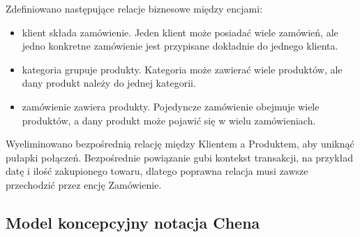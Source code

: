 \documentclass[a4paper,11pt,english,openany,oneside]{sphinxmanual}
\begin{document}
\sphinxAtStartPar
Zdefiniowano następujące relacje biznesowe między encjami:
\begin{itemize}
\item {} 
\sphinxAtStartPar
{} klient składa zamówienie. Jeden klient może posiadać wiele zamówień, ale jedno konkretne zamówienie jest przypisane dokładnie do jednego klienta.

\item {} 
\sphinxAtStartPar
{} kategoria grupuje produkty. Kategoria może zawierać wiele produktów, ale dany produkt należy do jednej kategorii.

\item {} 
\sphinxAtStartPar
{} zamówienie zawiera produkty. Pojedyncze zamówienie obejmuje wiele produktów, a dany produkt może pojawić się w wielu zamówieniach.

\end{itemize}

\sphinxAtStartPar
{}

\sphinxAtStartPar
Wyeliminowano bezpośrednią relację między Klientem a Produktem, aby uniknąć pułapki połączeń. Bezpośrednie powiązanie gubi kontekst transakcji, na przykład datę i ilość zakupionego towaru, dlatego poprawna relacja musi zawsze przechodzić przez encję Zamówienie.


\subsection{Model koncepcyjny \textendash{} notacja Chena}
\label{\detokenize{rozdzial_3/index:model-koncepcyjny-notacja-chena}}\begin{quote}

\noindent{}
\end{quote}
\end{document}
